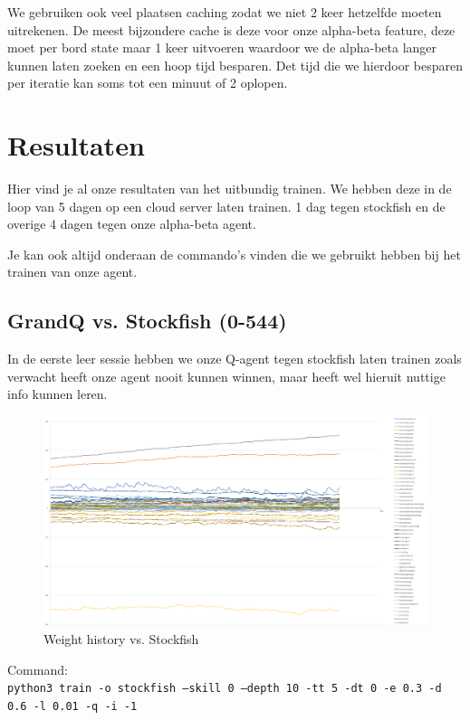 \documentclass[a4paper,openany]{uantwerpenassignment}
\newcommand{\codeword}[1]{
    \colorbox{code}{\texttt{\textcolor{codetext}{#1}}}
}
\begin{document}
We gebruiken ook veel plaatsen caching zodat we niet 2 keer hetzelfde moeten uitrekenen. De meest bijzondere cache is deze voor onze alpha-beta feature, deze moet per bord state maar 1 keer uitvoeren waardoor we de alpha-beta langer kunnen laten zoeken en een hoop tijd besparen.
Det tijd die we hierdoor besparen per iteratie kan soms tot een minuut of 2 oplopen.

\chapter{Resultaten}

Hier vind je al onze resultaten van het uitbundig trainen. We hebben deze in de loop van 5 dagen op een cloud server laten trainen. 1 dag tegen stockfish en de overige 4 dagen tegen onze alpha-beta agent.

Je kan ook altijd onderaan de commando's vinden die we gebruikt hebben bij het trainen van onze agent.

\section{GrandQ vs. Stockfish (0-544)}

In de eerste leer sessie hebben we onze Q-agent tegen stockfish laten trainen zoals verwacht heeft onze agent nooit kunnen winnen, maar heeft wel hieruit nuttige info kunnen leren.

\begin{figure}[h]
    \centering
    \includegraphics[width=\textwidth]{images/stockfish.png}
    \caption{Weight history vs. Stockfish}
    \label{fig:stockfish}
\end {figure}

Command:\\
\codeword{python3 train -o stockfish --skill 0 --depth 10 -tt 5 -dt 0 -e 0.3 -d 0.6 -l 0.01 -q -i -1}
\pagebreak
\end{document}
